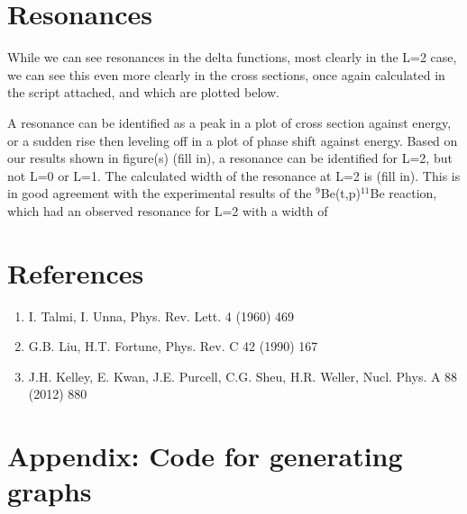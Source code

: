 \documentclass[11pt]{article} %
\begin{document}
\section{Resonances}

While we can see resonances in the delta functions, most clearly in the L=2 case, we can see this even more clearly in the cross sections, once again calculated in the script attached, and which are plotted below.\\


\vspace{.1mm}
\begin{figure}[htbp]
\centering
\begin{floatrow}
\quad
{}
\quad
{}
\end{floatrow}
\end{figure}
A resonance can be identified as a peak in a plot of cross section against energy, or a sudden rise then leveling off in a plot of phase shift against energy. Based on our results shown in figure(s) (fill in), a resonance can be identified for L=2, but not L=0 or L=1. The calculated width of the resonance at L=2 is (fill in). This is in good agreement with the experimental results of the $^{9}$Be(t,p)$^{11}$Be reaction, which had an observed resonance for L=2 with a width of 


\section{References}
\begin{enumerate}
\item I. Talmi, I. Unna, Phys. Rev. Lett. 4 (1960) 469
\item G.B. Liu, H.T. Fortune, Phys. Rev. C 42 (1990) 167
\item J.H. Kelley, E. Kwan, J.E. Purcell, C.G. Sheu, H.R. Weller, Nucl. Phys. A 88 (2012) 880
\end{enumerate}


\section{Appendix: Code for generating graphs}

\end{document}
